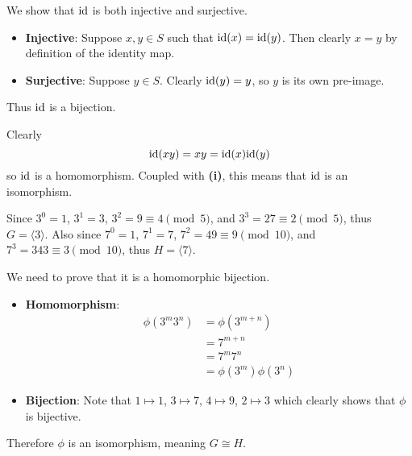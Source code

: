 \begin{questions}
    \item \begin{partquestions}{\roman*}
        \item We show that $\mathrm{id}$ is both injective and surjective.
        \begin{itemize}
            \item \textbf{Injective}: Suppose $x, y \in S$ such that $\mathrm{id}(x) = \mathrm{id}(y)$. Then clearly $x = y$ by definition of the identity map.
            \item \textbf{Surjective}: Suppose $y \in S$. Clearly $\mathrm{id}(y) = y$, so $y$ is its own pre-image.
        \end{itemize}
        Thus $\mathrm{id}$ is a bijection.

        \item Clearly
        \[
            \mathrm{id}(xy) = xy = \mathrm{id}(x)\mathrm{id}(y)
        \]
        so $\mathrm{id}$ is a homomorphism. Coupled with \textbf{(i)}, this means that $\mathrm{id}$ is an isomorphism.
    \end{partquestions}

    \item \begin{partquestions}{\roman*}
        \item Since $3^0 = 1$, $3^1 = 3$, $3^2 = 9 \equiv 4 \pmod{5}$, and $3^3 = 27 \equiv 2 \pmod{5}$, thus $G = \langle 3 \rangle$. Also since $7^0 = 1$, $7^1 = 7$, $7^2 = 49 \equiv 9 \pmod{10}$, and $7^3 = 343 \equiv 3 \pmod{10}$, thus $H = \langle 7 \rangle$.
        \item We need to prove that it is a homomorphic bijection.
        \begin{itemize}
            \item \textbf{Homomorphism}:
            \begin{align*}
                \phi(3^m3^n) &= \phi(3^{m+n})\\
                &= 7^{m+n}\\
                &= 7^m7^n\\
                &= \phi(3^m)\phi(3^n)
            \end{align*}

            \item \textbf{Bijection}: Note that $1 \mapsto 1$, $3 \mapsto 7$, $4 \mapsto 9$, $2 \mapsto 3$ which clearly shows that $\phi$ is bijective.
        \end{itemize}
        Therefore $\phi$ is an isomorphism, meaning $G \cong H$.
    \end{partquestions}


\end{questions}

